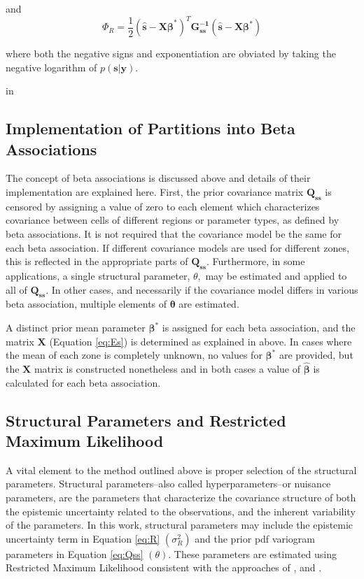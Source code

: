 \documentclass[11pt,oneside,onecolumn]{usgsreport}
\begin{document}
\begin{appendix}
\begin{bibunit}
and
\[
\Phi_{R}=\frac{1}{2}(\mathbf{\hat{s}-X\beta}^{*})^{T}\mathbf{G_{\mathbf{ss}}^{-1}}(\mathbf{\hat{s}-X\beta^{*}})
\]


where both the negative signs and exponentiation are obviated by taking
the negative logarithm of $p\left(\mathbf{s}|\mathbf{y}\right)$.

 in
\subsection{Implementation of Partitions into Beta Associations}

The concept of beta associations is discussed above and details of
their implementation are explained here. First, the prior covariance
matrix $\mathbf{Q_{ss}}$ is censored by assigning a value of zero
to each element which characterizes covariance between cells of different
regions or parameter types, as defined by beta associations. It is
not required that the covariance model be the same for each beta association.
If different covariance models are used for different zones, this
is reflected in the appropriate parts of $\mathbf{Q_{ss}}.$ Furthermore,
in some applications, a single structural parameter, $\theta,$ may
be estimated and applied to all of $\mathbf{Q_{ss}.}$ In other cases,
and necessarily if the covariance model differs in various beta association,
multiple elements of $\mathbf{\theta}$ are estimated.

A distinct prior mean parameter $\mathbf{\beta^{*}}$ is assigned
for each beta association, and the matrix $\mathbf{X}$ (Equation
\ref{eq:Es}) is determined as explained in above. In cases where
the mean of each zone is completely unknown, no values for $\mathbf{\beta^{*}}$
are provided, but the $\mathbf{X}$ matrix is constructed nonetheless
and in both cases a value of $\mathbf{\hat{\beta}}$ is calculated
for each beta association.


\subsection{\label{sub:Structural-Parameters}Structural Parameters and Restricted
Maximum Likelihood}

A vital element to the method outlined above is proper selection of
the structural parameters. Structural parameters--also called hyperparameters--or
nuisance parameters, are the parameters that characterize the covariance
structure of both the epistemic uncertainty related to the observations,
and the inherent variability of the parameters. In this work, structural
parameters may include the epistemic uncertainty term in Equation
\ref{eq:R} $\left(\sigma_{R}^{2}\right)$ and the prior pdf variogram
parameters in Equation \ref{eq:Qss} $\left(\theta\right).$ These
parameters are estimated using Restricted Maximum Likelihood consistent
with the approaches of \citet{KitanidisVomvoris1983}, \citet{Kitanidis1995}
and \citet{LiCirpka2007}.


\end{bibunit}
\end{appendix}
\end{document}
